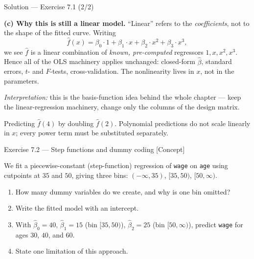 \documentclass[aspectratio=169,11pt]{beamer}
\begin{document}
\begin{frame}{Solution --- Exercise 7.1 (2/2)}
\begin{solutionbox}
\textbf{(c) Why this is still a linear model.} ``Linear'' refers to the \emph{coefficients}, not to the shape of the fitted curve. Writing
\[ \hat f(x)=\beta_0\cdot 1+\beta_1\cdot x+\beta_2\cdot x^2+\beta_3\cdot x^3, \]
we see $\hat f$ is a linear combination of \emph{known, pre-computed} regressors $1,x,x^2,x^3$. Hence all of the OLS machinery applies unchanged: closed-form $\hat\beta$, standard errors, $t$- and $F$-tests, cross-validation. The nonlinearity lives in $x$, not in the parameters.

\medskip
\emph{Interpretation:} this is the basis-function idea behind the whole chapter --- keep the linear-regression machinery, change only the columns of the design matrix.
\end{solutionbox}
\begin{mistake}
Predicting $\hat f(4)$ by doubling $\hat f(2)$. Polynomial predictions do not scale linearly in $x$; every power term must be substituted separately.
\end{mistake}
\end{frame}

\begin{frame}{Exercise 7.2 --- Step functions and dummy coding [Concept]}
\begin{exercise}
We fit a piecewise-constant (step-function) regression of \texttt{wage} on \texttt{age} using cutpoints at $35$ and $50$, giving three bins: $(-\infty,35)$, $[35,50)$, $[50,\infty)$.
\begin{enumerate}
  \item How many dummy variables do we create, and why is one bin omitted?
  \item Write the fitted model with an intercept.
  \item With $\hat\beta_0=40$, $\hat\beta_1=15$ (bin $[35,50)$), $\hat\beta_2=25$ (bin $[50,\infty)$), predict \texttt{wage} for ages $30$, $40$, and $60$.
  \item State one limitation of this approach.
\end{enumerate}
\end{exercise}
\end{frame}
\end{document}
